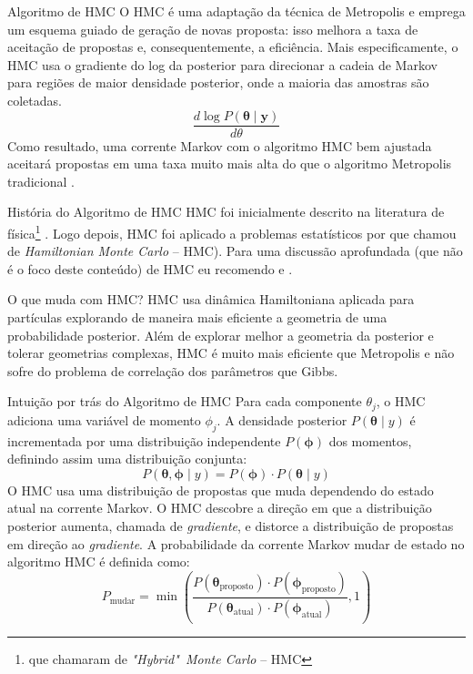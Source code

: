 \begin{frame}{Algoritmo de HMC}
  O HMC é uma adaptação da técnica de Metropolis e emprega um esquema guiado de
  geração de novas proposta: isso melhora a taxa de aceitação de propostas e,
  consequentemente, a eficiência.
  \vfill
  Mais especificamente, o HMC usa o gradiente do log da posterior para direcionar
  a cadeia de Markov para regiões de maior densidade posterior,
  onde a maioria das amostras são coletadas.
  $$
  \frac{d \log P(\boldsymbol{\theta} \mid \boldsymbol{y})}{d \theta}
  $$
  Como resultado, uma corrente Markov com o algoritmo HMC bem ajustada aceitará
  propostas em uma taxa muito mais alta do que o algoritmo Metropolis tradicional
  \parencite{robertsWeakConvergenceOptimal1997, beskosOptimalTuningHybrid2013}.
\end{frame}

\begin{frame}{História do Algoritmo de HMC}
  HMC foi inicialmente descrito na literatura de física\footnote{que chamaram de \textit{"Hybrid"~Monte Carlo} -- HMC}
  \parencite{duaneHybridMonteCarlo1987}.
  \vfill
  Logo depois, HMC foi aplicado a problemas estatísticos por
  \textcite{nealImprovedAcceptanceProcedure1994} que chamou de \textit{Hamiltonian Monte Carlo}
  -- HMC).
  \vfill
  Para uma discussão aprofundada (que não é o foco deste conteúdo) de HMC eu recomendo
  \textcite{neal2011mcmc} e \textcite{betancourtConceptualIntroductionHamiltonian2017}.
\end{frame}

\begin{frame}{O que muda com HMC?}
  HMC usa dinâmica Hamiltoniana aplicada para partículas explorando de maneira mais
  eficiente a geometria de uma probabilidade posterior.
  \vfill
  Além de explorar melhor a geometria da posterior e tolerar geometrias complexas,
  HMC é muito mais eficiente que Metropolis e não sofre do problema de correlação
  dos parâmetros que Gibbs.
\end{frame}

\begin{frame}{Intuição por trás do Algoritmo de HMC}
  \small
  Para cada componente $\theta_j$, o HMC adiciona uma variável de momento
  $\phi_j$. A densidade posterior $P(\boldsymbol{\theta} \mid y)$ é incrementada
  por uma distribuição independente $P(\boldsymbol{\phi})$ dos momentos,
  definindo assim uma distribuição conjunta:
  $$
  P(\boldsymbol{\theta}, \boldsymbol{\phi} \mid y) = P(\boldsymbol{\phi}) \cdot P(\boldsymbol{\theta} \mid y)
  $$
  \small
  O HMC usa uma distribuição de propostas que muda dependendo do estado atual na
  corrente Markov. O HMC descobre a direção em que a distribuição posterior aumenta,
  chamada de \textit{gradiente}, e distorce a distribuição de propostas em
  direção ao \textit{gradiente}.
  \vfill
  A probabilidade da corrente Markov mudar de estado no algoritmo HMC é definida como:
  $$
  P_{\text{mudar}} = \min\left({\frac{P(\boldsymbol{\theta}_{\text{proposto}}) \cdot P(\boldsymbol{\phi}_{\text{proposto}})}{P(\boldsymbol{\theta}_{\text{atual}})\cdot P(\boldsymbol{\phi}_{\text{atual}})}}, 1\right)
  $$
\end{frame}

